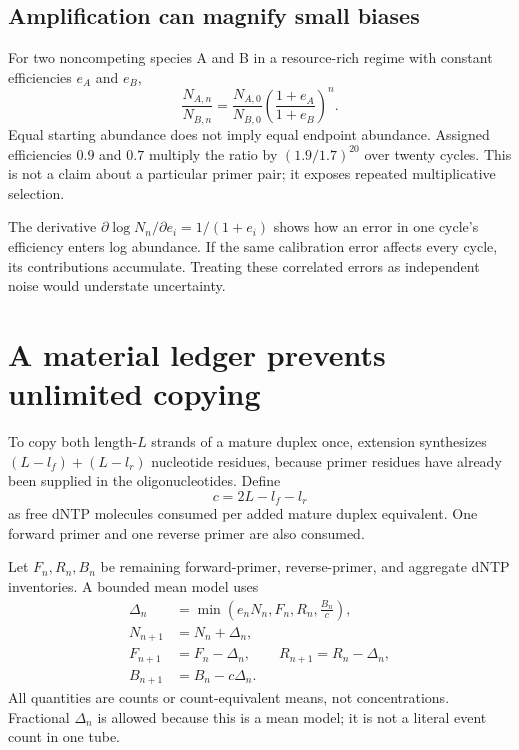 \subsection{Amplification can magnify small biases}
For two noncompeting species A and B in a resource-rich regime with constant efficiencies $e_A$ and $e_B$,
\begin{equation}
\frac{N_{A,n}}{N_{B,n}}
=\frac{N_{A,0}}{N_{B,0}}
\left(\frac{1+e_A}{1+e_B}\right)^n. \label{eq:bias}
\end{equation}
Equal starting abundance does not imply equal endpoint abundance. Assigned efficiencies $0.9$ and $0.7$ multiply the ratio by $(1.9/1.7)^{20}$ over twenty cycles. This is not a claim about a particular primer pair; it exposes repeated multiplicative selection.

The derivative $\partial\log N_n/\partial e_i=1/(1+e_i)$ shows how an error in one cycle's efficiency enters log abundance. If the same calibration error affects every cycle, its contributions accumulate. Treating these correlated errors as independent noise would understate uncertainty.

\section{A material ledger prevents unlimited copying}
To copy both length-$L$ strands of a mature duplex once, extension synthesizes $(L-l_f)+(L-l_r)$ nucleotide residues, because primer residues have already been supplied in the oligonucleotides. Define
\begin{equation}
c=2L-l_f-l_r
\end{equation}
as free dNTP molecules consumed per added mature duplex equivalent. One forward primer and one reverse primer are also consumed.


Let $F_n,R_n,B_n$ be remaining forward-primer, reverse-primer, and aggregate dNTP inventories. A bounded mean model uses
\begin{align}
\Delta_n&=\min\left(e_nN_n,F_n,R_n,\frac{B_n}{c}\right),\\
N_{n+1}&=N_n+\Delta_n,\\
F_{n+1}&=F_n-\Delta_n,\qquad R_{n+1}=R_n-\Delta_n,\\
B_{n+1}&=B_n-c\Delta_n. \label{eq:budget}
\end{align}
All quantities are counts or count-equivalent means, not concentrations. Fractional $\Delta_n$ is allowed because this is a mean model; it is not a literal event count in one tube.

